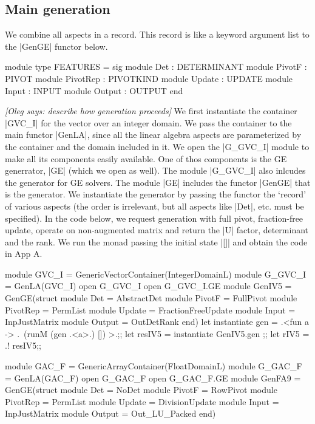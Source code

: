 \documentclass[draft]{elsart}
\newcommand{\oleg}[1]{{\it [Oleg says: #1]}}
\begin{document}
\subsection{Main generation}
We combine all aspects in a record. This record is like a keyword
argument list to the |GenGE| functor below.
\begin{code}
module type FEATURES = sig
  module Det       : DETERMINANT
  module PivotF    : PIVOT
  module PivotRep  : PIVOTKIND
  module Update    : UPDATE
  module Input     : INPUT
  module Output    : OUTPUT
end
\end{code}

\oleg{describe how generation proceeds}
We first instantiate the container |GVC_I| for the vector over an
integer domain. We pass the container to the main functor |GenLA|,
since all the linear algebra aspects are parameterized by the
container and the domain included in it. We open the |G_GVC_I| module
to make all its components easily available. One of thos components is
the GE generrator, |GE| (which we open as well). The module |G_GVC_I|
also inlcudes the generator for GE solvers. The module |GE| includes
the functor |GenGE| that is the generator. We instantiate the
generator by passing the functor the `record' of various aspects (the
order is irrelevant, but all aspects like |Det|, etc. must be
specified). In the code below, we request generation with full pivot,
fraction-free update, operate on non-augmented matrix and return the
|U| factor, determinant and the rank. We run the monad passing the
initial state |[]| and obtain the code in App A.

\begin{code}
module GVC_I = GenericVectorContainer(IntegerDomainL)
module G_GVC_I = GenLA(GVC_I)
open G_GVC_I
open G_GVC_I.GE
module GenIV5 = GenGE(struct 
    module Det = AbstractDet
    module PivotF = FullPivot
    module PivotRep = PermList
    module Update = FractionFreeUpdate
    module Input = InpJustMatrix
    module Output = OutDetRank end)
let instantiate gen =
    .<fun a -> .~(runM (gen .<a>.) []) >.;;
let resIV5 = instantiate GenIV5.gen ;;
let rIV5 = .! resIV5;;

module GAC_F = GenericArrayContainer(FloatDomainL)
module G_GAC_F = GenLA(GAC_F)
open G_GAC_F
open G_GAC_F.GE
module GenFA9 = GenGE(struct 
    module Det = NoDet
    module PivotF = RowPivot
    module PivotRep = PermList
    module Update = DivisionUpdate
    module Input = InpJustMatrix
    module Output = Out_LU_Packed end)
\end{code}
\end{document}
